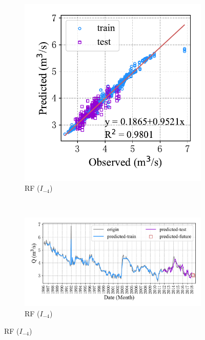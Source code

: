 \begin{figure}[!htbp]
\begin{subfigure}[b]{0.615\textwidth}
  \end{subfigure}
  \\
  \begin{subfigure}[b]{0.305\textwidth}
    \includegraphics[width=\textwidth]{Img/chap4_spr/spr_scatter_in_4_out_3_rf.pdf}
    \vspace{-1.2cm}
    \caption{RF ($I_{-4}$)}
    \label{fig:spr_scatter_in_4_out_3_rf}
  \end{subfigure}
  ~
  \begin{subfigure}[b]{0.615\textwidth}
    \includegraphics[width=\textwidth]{Img/chap4_spr/spr_series_in_4_out_3_rf.pdf}
    \vspace{-1.2cm}
    \caption{RF ($I_{-4}$)}
    \label{fig:spr_series_in_4_out_3_rf}
  \end{subfigure}
  \label{fig:spr_out_3}
\end{figure}

